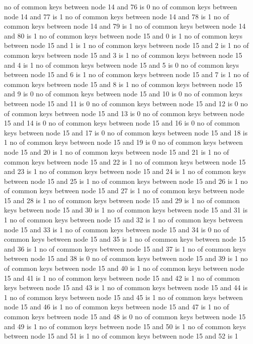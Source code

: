 no of common keys between node 14 and 76 is 0
no of common keys between node 14 and 77 is 1
no of common keys between node 14 and 78 is 1
no of common keys between node 14 and 79 is 1
no of common keys between node 14 and 80 is 1
no of common keys between node 15 and 0 is 1
no of common keys between node 15 and 1 is 1
no of common keys between node 15 and 2 is 1
no of common keys between node 15 and 3 is 1
no of common keys between node 15 and 4 is 1
no of common keys between node 15 and 5 is 0
no of common keys between node 15 and 6 is 1
no of common keys between node 15 and 7 is 1
no of common keys between node 15 and 8 is 1
no of common keys between node 15 and 9 is 0
no of common keys between node 15 and 10 is 0
no of common keys between node 15 and 11 is 0
no of common keys between node 15 and 12 is 0
no of common keys between node 15 and 13 is 0
no of common keys between node 15 and 14 is 0
no of common keys between node 15 and 16 is 0
no of common keys between node 15 and 17 is 0
no of common keys between node 15 and 18 is 1
no of common keys between node 15 and 19 is 0
no of common keys between node 15 and 20 is 1
no of common keys between node 15 and 21 is 1
no of common keys between node 15 and 22 is 1
no of common keys between node 15 and 23 is 1
no of common keys between node 15 and 24 is 1
no of common keys between node 15 and 25 is 1
no of common keys between node 15 and 26 is 1
no of common keys between node 15 and 27 is 1
no of common keys between node 15 and 28 is 1
no of common keys between node 15 and 29 is 1
no of common keys between node 15 and 30 is 1
no of common keys between node 15 and 31 is 1
no of common keys between node 15 and 32 is 1
no of common keys between node 15 and 33 is 1
no of common keys between node 15 and 34 is 0
no of common keys between node 15 and 35 is 1
no of common keys between node 15 and 36 is 1
no of common keys between node 15 and 37 is 1
no of common keys between node 15 and 38 is 0
no of common keys between node 15 and 39 is 1
no of common keys between node 15 and 40 is 1
no of common keys between node 15 and 41 is 1
no of common keys between node 15 and 42 is 1
no of common keys between node 15 and 43 is 1
no of common keys between node 15 and 44 is 1
no of common keys between node 15 and 45 is 1
no of common keys between node 15 and 46 is 1
no of common keys between node 15 and 47 is 1
no of common keys between node 15 and 48 is 0
no of common keys between node 15 and 49 is 1
no of common keys between node 15 and 50 is 1
no of common keys between node 15 and 51 is 1
no of common keys between node 15 and 52 is 1
